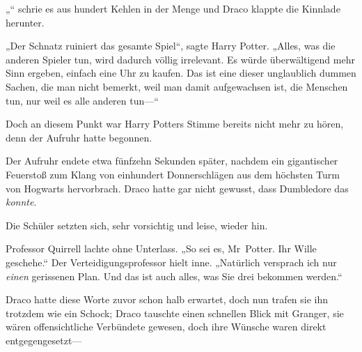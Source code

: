 „“ schrie es aus hundert Kehlen in der Menge und Draco klappte die Kinnlade herunter.

„Der Schnatz ruiniert das gesamte Spiel“, sagte Harry Potter. „Alles, was die anderen Spieler tun, wird dadurch völlig irrelevant. Es würde überwältigend mehr Sinn ergeben, einfach eine Uhr zu kaufen. Das ist eine dieser unglaublich dummen Sachen, die man nicht bemerkt, weil man damit aufgewachsen ist, die Menschen tun, nur weil es alle anderen tun—“

Doch an diesem Punkt war Harry Potters Stimme bereits nicht mehr zu hören, denn der Aufruhr hatte begonnen.

\later

Der Aufruhr endete etwa fünfzehn Sekunden später, nachdem ein gigantischer Feuerstoß zum Klang von einhundert Donnerschlägen aus dem höchsten Turm von Hogwarts hervorbrach. Draco hatte gar nicht gewusst, dass Dumbledore das \emph{konnte}.

Die Schüler setzten sich, sehr vorsichtig und leise, wieder hin.

Professor Quirrell lachte ohne Unterlass. „So sei es, Mr~Potter. Ihr Wille geschehe.“ Der Verteidigungsprofessor hielt inne. „Natürlich versprach ich nur \emph{einen} gerissenen Plan. Und das ist auch alles, was Sie drei bekommen werden.“

Draco hatte diese Worte zuvor schon halb erwartet, doch nun trafen sie ihn trotzdem wie ein Schock; Draco tauschte einen schnellen Blick mit Granger, sie wären offensichtliche Verbündete gewesen, doch ihre Wünsche waren direkt entgegengesetzt—

